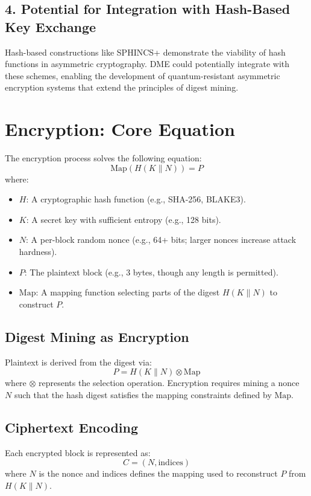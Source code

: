 \documentclass[11pt,a4paper]{article}
\begin{document}
\subsection*{4. Potential for Integration with Hash-Based Key Exchange}
Hash-based constructions like SPHINCS+ demonstrate the viability of hash functions in asymmetric cryptography. DME could potentially integrate with these schemes, enabling the development of quantum-resistant asymmetric encryption systems that extend the principles of digest mining.

\section*{Encryption: Core Equation}
The encryption process solves the following equation:
\[
\text{Map}(H(K \parallel N)) = P
\]
where:
\begin{itemize}
  \item \( H \): A cryptographic hash function (e.g., SHA-256, BLAKE3).
  \item \( K \): A secret key with sufficient entropy (e.g., 128 bits).
  \item \( N \): A per-block random nonce (e.g., 64+ bits; larger nonces increase attack hardness).
  \item \( P \): The plaintext block (e.g., 3 bytes, though any length is permitted).
  \item \( \text{Map} \): A mapping function selecting parts of the digest \( H(K \parallel N) \) to construct \( P \).
\end{itemize}

\subsection*{Digest Mining as Encryption}
Plaintext is derived from the digest via:
\[
P = H(K \parallel N) \otimes \text{Map}
\]
where \( \otimes \) represents the selection operation. Encryption requires mining a nonce \( N \) such that the hash digest satisfies the mapping constraints defined by \( \text{Map} \).

\subsection*{Ciphertext Encoding}
Each encrypted block is represented as:
\[
C = (N, \text{indices})
\]
where \( N \) is the nonce and \( \text{indices} \) defines the mapping used to reconstruct \( P \) from \( H(K \parallel N) \).
\end{document}
